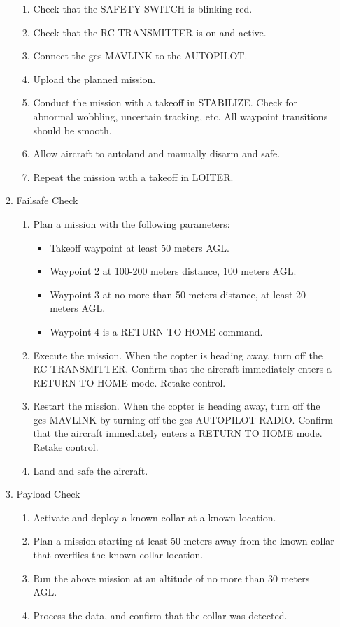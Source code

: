\documentclass{report}
\begin{document}
\begin{enumerate}
\begin{enumerate}
\begin{enumerate}
							\item Check that the SAFETY SWITCH is blinking red.
							\item Check that the RC TRANSMITTER is on and active.
							\item Connect the \gls{gcs} MAVLINK to the AUTOPILOT.
							\item Upload the planned mission.
							\item Conduct the mission with a takeoff in STABILIZE.  Check for abnormal wobbling, uncertain tracking, etc.  All waypoint transitions should be smooth.
							\item Allow aircraft to autoland and manually disarm and safe.
							\item Repeat the mission with a takeoff in LOITER.
						\end{enumerate}
					\item Failsafe Check
						\begin{enumerate}
							\item Plan a mission with the following parameters:
								\begin{itemize}
									\item Takeoff waypoint at least 50 meters AGL.
									\item Waypoint 2 at 100-200 meters distance, 100 meters AGL.
									\item Waypoint 3 at no more than 50 meters distance, at least 20 meters AGL.
									\item Waypoint 4 is a RETURN TO HOME command.
								\end{itemize}
							\item Execute the mission.  When the copter is heading away, turn off the RC TRANSMITTER.  Confirm that the aircraft immediately enters a RETURN TO HOME mode.  Retake control.
							\item Restart the mission.  When the copter is heading away, turn off the \gls{gcs} MAVLINK by turning off the \gls{gcs} AUTOPILOT RADIO.  Confirm that the aircraft immediately enters a RETURN TO HOME mode.  Retake control.
							\item Land and safe the aircraft.
						\end{enumerate}
					\item Payload Check
						\begin{enumerate}
							\item Activate and deploy a known collar at a known location.
							\item Plan a mission starting at least 50 meters away from the known collar that overflies the known collar location.
							\item Run the above mission at an altitude of no more than 30 meters AGL.
							\item Process the data, and confirm that the collar was detected.
						\end{enumerate}
				\end{enumerate}
		\end{enumerate}
\end{document}
